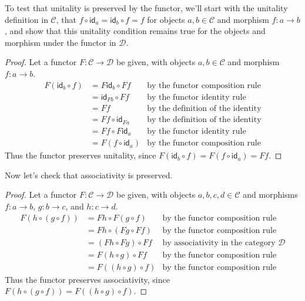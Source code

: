 \documentclass[12pt]{article}
\begin{document}
To test that unitality is preserved by the functor, we'll start with the unitality definition in $\mathcal{C}$, that $f\circ \mathsf{id}_a=\mathsf{id}_b\circ f=f$ for objects $a,b\in\mathcal{C}$ and morphism $f:a \rightarrow b$, and show that this unitality condition remains true for the objects and morphism under the functor in $\mathcal{D}$.
\begin{proof}
    Let a functor $F:\mathcal{C} \rightarrow \mathcal{D}$ be given, with objects $a,b\in\mathcal{C}$ and morphism $f:a \rightarrow b$.
    \begin{align*}
        F(\mathsf{id}_b \circ f) & = F\mathsf{id}_b \circ Ff   & \text{by the functor composition rule}   \\
                                 & = \mathsf{id}_{Fb} \circ Ff & \text{by the functor identity rule}      \\
                                 & = Ff                        & \text{by the definition of the identity} \\
                                 & = Ff \circ \mathsf{id}_{Fa} & \text{by the definition of the identity} \\
                                 & = Ff \circ F\mathsf{id}_a   & \text{by the functor identity rule}      \\
                                 & = F(f \circ \mathsf{id}_a)  & \text{by the functor composition rule}
    \end{align*}
    Thus the functor preserves unitality, since $F(\mathsf{id}_b \circ f) = F(f \circ \mathsf{id}_a) = Ff$.
\end{proof}
Now let's check that associativity is preserved.
\begin{proof}
    Let a functor $F:\mathcal{C} \rightarrow \mathcal{D}$ be given, with objects $a,b,c,d\in\mathcal{C}$ and morphisms $f:a \rightarrow b$, $g:b \rightarrow c$, and $h:c \rightarrow d$.
    \begin{align*}
        F(h \circ (g \circ f)) & = Fh \circ F(g \circ f)  & \text{by the functor composition rule}                \\
                               & = Fh \circ (Fg \circ Ff) & \text{by the functor composition rule}                \\
                               & = (Fh \circ Fg) \circ Ff & \text{by associativity in the category $\mathcal{D}$} \\
                               & = F(h \circ g) \circ Ff  & \text{by the functor composition rule}                \\
                               & = F((h \circ g) \circ f) & \text{by the functor composition rule}
    \end{align*}
    Thus the functor preserves associativity, since $F(h \circ (g \circ f)) = F((h \circ g) \circ f)$.
\end{proof}
\end{document}
